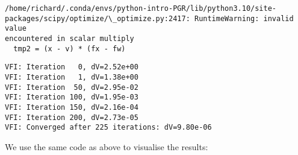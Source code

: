 \documentclass{scrartcl}
\begin{document}
    \begin{Verbatim}[commandchars=\\\{\}]
/home/richard/.conda/envs/python-intro-PGR/lib/python3.10/site-
packages/scipy/optimize/\_optimize.py:2417: RuntimeWarning: invalid value
encountered in scalar multiply
  tmp2 = (x - v) * (fx - fw)
    \end{Verbatim}

    \begin{Verbatim}[commandchars=\\\{\}]
VFI: Iteration   0, dV=2.52e+00
VFI: Iteration   1, dV=1.38e+00
VFI: Iteration  50, dV=2.95e-02
VFI: Iteration 100, dV=1.95e-03
VFI: Iteration 150, dV=2.16e-04
VFI: Iteration 200, dV=2.73e-05
VFI: Converged after 225 iterations: dV=9.80e-06
    \end{Verbatim}

    We use the same code as above to visualise the results:
\end{document}
